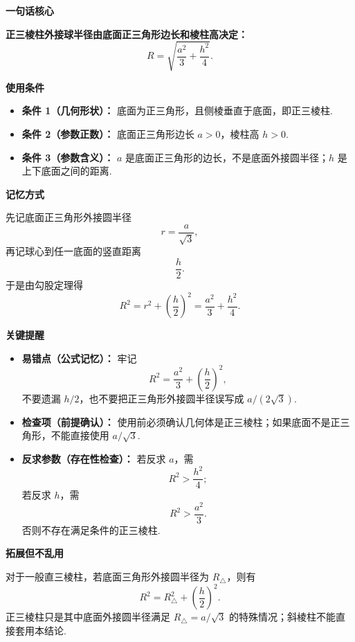 \begin{summarybox}
	\textbf{\textcolor{CSummary}{一句话核心}}

	\textbf{正三棱柱外接球半径由底面正三角形边长和棱柱高决定：}
	\[
		\boxed{R=\sqrt{\frac{a^{2}}{3}+\frac{h^{2}}{4}}}.
	\]

	\medskip
	\textbf{\textcolor{CSummary}{使用条件}}
	\begin{itemize}[leftmargin=*, itemsep=0.5em, topsep=0.4em]
		\item \textbf{条件 1（几何形状）：} 底面为正三角形，且侧棱垂直于底面，即正三棱柱.
		\item \textbf{条件 2（参数正数）：} 底面正三角形边长 $a>0$，棱柱高 $h>0$.
		\item \textbf{条件 3（参数含义）：} $a$ 是底面正三角形的边长，不是底面外接圆半径；$h$ 是上下底面之间的距离.
	\end{itemize}

	\medskip
	\textbf{\textcolor{CSummary}{记忆方式}}

	先记底面正三角形外接圆半径
	\[
		r=\frac a{\sqrt3},
	\]
	再记球心到任一底面的竖直距离
	\[
		\frac h2.
	\]
	于是由勾股定理得
	\[
		R^{2}=r^{2}+\left(\frac h2\right)^{2}
		=\frac{a^{2}}{3}+\frac{h^{2}}{4}.
	\]

	\medskip
	\textbf{\textcolor{CSummary}{关键提醒}}
	\begin{itemize}[leftmargin=*, itemsep=0.5em, topsep=0.4em]
		\item \textbf{易错点（公式记忆）：} 牢记
		      \[
			      R^{2}=\frac{a^{2}}{3}+\left(\frac h2\right)^{2},
		      \]
		      不要遗漏 $h/2$，也不要把正三角形外接圆半径误写成 $a/(2\sqrt3)$.

		\item \textbf{检查项（前提确认）：} 使用前必须确认几何体是正三棱柱；如果底面不是正三角形，不能直接使用 $a/\sqrt3$.

		\item \textbf{反求参数（存在性检查）：} 若反求 $a$，需
		      \[
			      R^{2}>\frac{h^{2}}{4};
		      \]
		      若反求 $h$，需
		      \[
			      R^{2}>\frac{a^{2}}{3}.
		      \]
		      否则不存在满足条件的正三棱柱.
	\end{itemize}

	\medskip
	\textbf{\textcolor{CSummary}{拓展但不乱用}}

	对于一般直三棱柱，若底面三角形外接圆半径为 $R_{\triangle}$，则有
	\[
		R^{2}=R_{\triangle}^{2}+\left(\frac h2\right)^{2}.
	\]
	正三棱柱只是其中底面外接圆半径满足 $R_{\triangle}=a/\sqrt3$ 的特殊情况；斜棱柱不能直接套用本结论.
\end{summarybox}